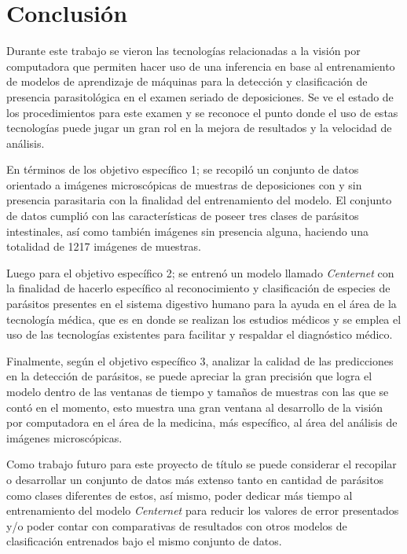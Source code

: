 \documentclass[letter,12pt]{report}
\begin{document}
\chapter{Conclusión}\label{conclusion}
Durante este trabajo se vieron las tecnologías relacionadas a la visión por
computadora que permiten hacer uso de una inferencia en base al entrenamiento
de modelos de aprendizaje de máquinas para la detección y clasificación de
presencia parasitológica en el examen seriado de deposiciones. Se ve el estado
de los procedimientos para este examen y se reconoce el punto donde el uso de
estas tecnologías puede jugar un gran rol en la mejora de resultados y la
velocidad de análisis.

En términos de los objetivo específico 1; se recopiló un conjunto de datos
orientado a imágenes microscópicas de muestras de deposiciones con y sin
presencia parasitaria con la finalidad del entrenamiento del modelo. El
conjunto de datos cumplió con las características de poseer tres clases de
parásitos intestinales, así como también imágenes sin presencia alguna,
haciendo una totalidad de 1217 imágenes de muestras.

Luego para el objetivo específico 2; se entrenó un modelo llamado
\textit{Centernet} con la finalidad de hacerlo específico al reconocimiento y
clasificación de especies de parásitos presentes en el sistema digestivo humano
para la ayuda en el área de la tecnología médica, que es en donde se realizan
los estudios médicos y se emplea el uso de las tecnologías existentes para
facilitar y respaldar el diagnóstico médico.

Finalmente, según el objetivo específico 3, analizar la calidad de las
predicciones en la detección de parásitos, se puede apreciar la gran precisión
que logra el modelo dentro de las ventanas de tiempo y tamaños de muestras con
las que se contó en el momento, esto muestra una gran ventana al desarrollo de
la visión por computadora en el área de la medicina, más específico, al área
del análisis de imágenes microscópicas.

Como trabajo futuro para este proyecto de título se puede considerar el
recopilar o desarrollar un conjunto de datos más extenso tanto en cantidad de
parásitos como clases diferentes de estos, así mismo, poder dedicar más tiempo
al entrenamiento del modelo \textit{Centernet} para reducir los valores de
error presentados y/o poder contar con comparativas de resultados con otros
modelos de clasificación entrenados bajo el mismo conjunto de datos.
\end{document}
